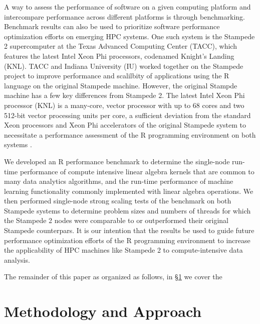 A way to assess the performance of software on a given computing platform and intercompare
performance across different platforms is through benchmarking. Benchmark results can also
be used to prioritize software performance optimization efforts on emerging HPC systems.
One such system is the Stampede 2 supercomputer at the Texas Advanced Computing Center
(TACC), which features the latest Intel Xeon Phi processors, codenamed Knight's Landing
(KNL). TACC and  Indiana University (IU) worked together on the Stampede project to
improve performance and scalilbity of applications using the R language on the original
Stampede machine. However, the original Stampde machine has a few key differences from
Stampede 2. The latest Intel Xeon Phi processor (KNL) is a many-core, vector processor
with up to 68 cores and two 512-bit vector processing units per core, a sufficient
deviation from the standard Xeon processors and Xeon Phi accelerators of the original
Stampede system to necessitate a performance assessment of the R programming environment
on both systems \cite{tacc:stampedeGuide}.

We developed an R performance benchmark to determine the single-node run-time performance
of compute intensive linear algebra kernels that are common to many data analytics
algorithms, and the run-time performance of machine learning functionality commonly
implemented with linear algebra operations.  We then performed single-node strong scaling
tests of the benchmark on both Stampede systems to determine problem sizes and numbers of
threads for which the Stampede 2 nodes were comparable to or outperformed their original
Stampede counterpars.  It is our intention that the results be used to guide future
performance optimization efforts of the R programming environment to increase the
applicability of HPC machines like Stampede 2 to compute-intensive data
analysis.

The remainder of this paper as organized as follows, in \S\ref{sec:Methodology} we cover the 


\section{Methodology and Approach}\label{sec:Methodology}


